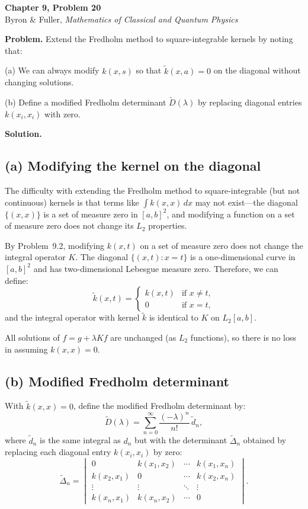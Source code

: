 \documentclass[12pt]{article}
\begin{document}
\begin{center}
{\Large\bfseries Chapter 9, Problem 20}\\[6pt]
Byron \& Fuller, \textit{Mathematics of Classical and Quantum Physics}
\end{center}

\bigskip

\textbf{Problem.} Extend the Fredholm method to square-integrable kernels by noting that:

(a) We can always modify $k(x,s)$ so that $\tilde{k}(x,a) = 0$ on the diagonal without changing solutions.

(b) Define a modified Fredholm determinant $\tilde{D}(\lambda)$ by replacing diagonal entries $k(x_i,x_i)$ with zero.

\bigskip
\textbf{Solution.}

\subsection*{(a) Modifying the kernel on the diagonal}

The difficulty with extending the Fredholm method to square-integrable (but not continuous) kernels is that terms like $\int k(x,x)\,dx$ may not exist---the diagonal $\{(x,x)\}$ is a set of measure zero in $[a,b]^2$, and modifying a function on a set of measure zero does not change its $L_2$ properties.

By Problem~9.2, modifying $k(x,t)$ on a set of measure zero does not change the integral operator $K$. The diagonal $\{(x,t) : x = t\}$ is a one-dimensional curve in $[a,b]^2$ and has two-dimensional Lebesgue measure zero. Therefore, we can define:
\[
\tilde{k}(x,t) = \begin{cases} k(x,t) & \text{if } x \neq t, \\ 0 & \text{if } x = t, \end{cases}
\]
and the integral operator with kernel $\tilde{k}$ is identical to $K$ on $L_2[a,b]$.

All solutions of $f = g + \lambda Kf$ are unchanged (as $L_2$ functions), so there is no loss in assuming $k(x,x) = 0$.

\subsection*{(b) Modified Fredholm determinant}

With $\tilde{k}(x,x) = 0$, define the modified Fredholm determinant by:
\[
\tilde{D}(\lambda) = \sum_{n=0}^{\infty} \frac{(-\lambda)^n}{n!}\,\tilde{d}_n,
\]
where $\tilde{d}_n$ is the same integral as $d_n$ but with the determinant $\tilde{\Delta}_n$ obtained by replacing each diagonal entry $k(x_i, x_i)$ by zero:
\[
\tilde{\Delta}_n = \begin{vmatrix} 0 & k(x_1,x_2) & \cdots & k(x_1,x_n) \\ k(x_2,x_1) & 0 & \cdots & k(x_2,x_n) \\ \vdots & \vdots & \ddots & \vdots \\ k(x_n,x_1) & k(x_n,x_2) & \cdots & 0 \end{vmatrix}.
\]
\end{document}
